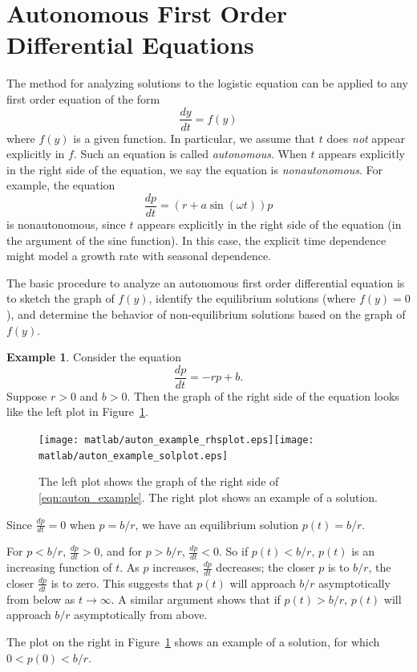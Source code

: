 \documentclass[reqno]{immbook}
\numberwithin{equation}{chapter}
\numberwithin{question}{section}
\numberwithin{theorem}{chapter}
\numberwithin{figure}{chapter}
\theoremstyle{definition}
\newtheorem{example}{Example}[section]
\begin{document}
\section{Autonomous First Order Differential Equations}
The method for analyzing solutions to the logistic equation can be
applied to any first order equation of the form
\begin{equation}
   \frac{dy}{dt} = f(y)
\end{equation}
where $f(y)$ is a given function.
In particular, we assume that $t$ does \emph{not} appear explicitly
in $f$.  Such an equation is called \emph{autonomous}.
When $t$ appears explicitly in the right side of the equation,
we say the equation is \emph{nonautonomous}.
For example, the equation
\begin{equation}
  \frac{dp}{dt} = (r+a \sin(\omega t))p
\end{equation}
is nonautonomous, since $t$ appears explicitly in the right side of the
equation (in the argument of the sine function).
In this case, the explicit time dependence might model a growth
rate with seasonal dependence.

The basic procedure to analyze an autonomous
first order differential equation is to sketch the graph of $f(y)$, identify
the equilibrium solutions (where $f(y)=0$), and determine the
behavior of non-equilibrium solutions based on the graph
of $f(y)$.

\begin{example}
Consider the equation
\begin{equation}
\frac{dp}{dt} = -rp + b.
\label{eqn:auton_example}
\end{equation}
Suppose $r > 0$ and $b > 0$.
Then the graph of the right side of the equation looks like
the left plot in Figure~\ref{fig:auton_example_plots}.
\begin{figure}
\centerline{\texttt{[image: matlab/auton\_example\_rhsplot.eps]}\hspace{0.25in}\texttt{[image: matlab/auton\_example\_solplot.eps]}}
\caption{The left plot shows the graph of the right side of \eqref{eqn:auton_example}.
The right plot shows an example of a solution.}
\label{fig:auton_example_plots}
\end{figure}
Since $\frac{dp}{dt} = 0$ when $p = b/r$, we have an
equilibrium solution $p(t) = b/r$.

For $p < b/r$, $\frac{dp}{dt} > 0$, and for
$p > b/r$, $\frac{dp}{dt} < 0$.
So if $p(t) < b/r$, $p(t)$ is an increasing function of
$t$.  As $p$ increases, $\frac{dp}{dt}$ decreases; the closer
$p$ is to $b/r$, the closer $\frac{dp}{dt}$
is to zero.
This suggests that $p(t)$ will approach $b/r$ asymptotically
from below as $t\rightarrow\infty$.
A similar argument shows that if $p(t) > b/r$,
$p(t)$ will approach $b/r$ asymptotically from above.

The plot on the right in Figure~\ref{fig:auton_example_plots}
shows an example of a solution, for which $0 < p(0) < b/r$.
\end{example}
\end{document}

